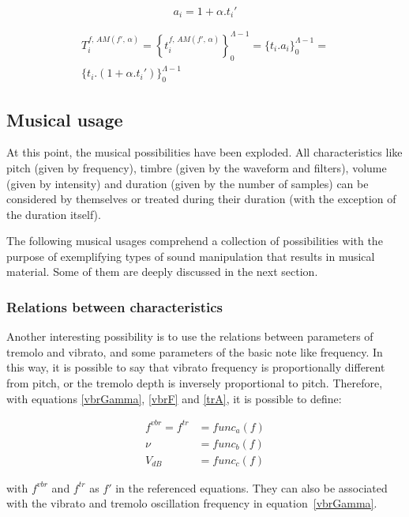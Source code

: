 \documentclass[
 aip,
 jmp,
 amsmath,amssymb,
 reprint,
]{revtex4-1}
\begin{document}
\begin{equation}\label{amA}
a_i=1 + \alpha . t_i'
\end{equation}

\begin{multline}\label{amT}
T_i^{f,\,AM(f',\,\alpha)}=\left\{ t_i^{f,\,AM(f',\,\alpha)} \right\}_0^{\Lambda-1}=\{ t_i . a_i \}_0^{\Lambda-1}= \\ \{t_i . (1 + \alpha . t_i')    \}_0^{\Lambda-1}
\end{multline}


\subsection{Musical usage}\label{subsec:mus2}

At this point, the musical possibilities have been exploded. All characteristics like pitch (given by frequency), timbre (given by the waveform and filters), volume (given by intensity) and duration (given by the number of samples) can be considered by themselves or treated during their duration (with the exception of the duration itself).

The following musical usages comprehend a collection of possibilities
with the purpose of exemplifying types of sound manipulation that results in
musical material. Some of them are deeply discussed in the next section.


\subsubsection{Relations between characteristics}

Another interesting possibility is to use the relations between parameters of
tremolo and vibrato, and some parameters of the basic note like frequency. In
this way, it is possible to say that vibrato frequency is proportionally
different from pitch, or the tremolo depth is inversely proportional to
pitch. Therefore, with equations \ref{vbrGamma}, \ref{vbrF} and \ref{trA}, it is
possible to define:

\begin{equation}\label{eq:vinculos}
\begin{split}
f^{vbr} = f^{tr} & = func_a(f) \\
\nu & = func_b(f) \\
V_{dB} & = func_c(f)
\end{split}
\end{equation}

\noindent with $f^{vbr}$ and $f^{tr}$ as $f'$ in the referenced equations. They can also be associated with the vibrato and tremolo oscillation frequency in
equation~\ref{vbrGamma}. 
\end{document}
